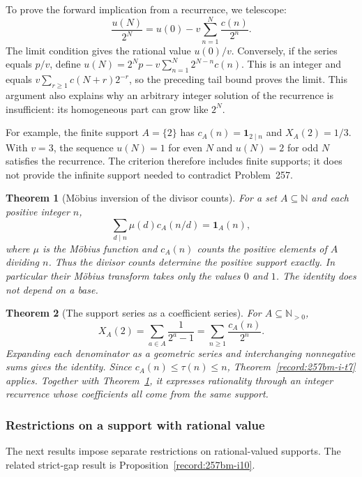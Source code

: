 \documentclass[11pt]{article}
\theoremstyle{plain}
\newtheorem{thm}{Theorem}[section]
\theoremstyle{definition}
\theoremstyle{remark}
\newcommand{\N}{\mathbb{N}}
\newcommand{\Npos}{\mathbb{N}_{>0}}
\begin{document}
To prove the forward implication from a recurrence, we telescope:
\[
 \frac{u(N)}{2^N}=u(0)-v\sum_{n=1}^N\frac{c(n)}{2^n}.
\]
The limit condition gives the rational value $u(0)/v$.  Conversely, if the
series equals $p/v$, define
$u(N)=2^Np-v\sum_{n=1}^N2^{N-n}c(n)$.  This is an integer and equals
$v\sum_{r\ge1}c(N+r)2^{-r}$, so the preceding tail bound proves the limit.
This argument also explains why an arbitrary integer solution of the
recurrence is insufficient: its homogeneous part can grow like $2^N$.

For example, the finite support $A=\{2\}$ has
$c_A(n)=\mathbf1_{2\mid n}$ and $X_A(2)=1/3$.  With $v=3$, the sequence
$u(N)=1$ for even $N$ and $u(N)=2$ for odd $N$ satisfies the recurrence.
The criterion therefore includes finite supports; it does not provide the
infinite support needed to contradict Problem~257.

\begin{thm}[M\"obius inversion of the divisor counts]\label{record:257bm-i-mob}
For a set $A\subseteq\N$ and each positive integer $n$,
\[
 \sum_{d\mid n}\mu(d)c_A(n/d)=\mathbf1_A(n),
\]
where $\mu$ is the M\"obius function and $c_A(n)$ counts the positive
elements of $A$ dividing $n$.  Thus the divisor counts determine the
positive support exactly.  In particular their M\"obius transform takes
only the values $0$ and $1$.  The identity does not depend on a base.
\end{thm}

\begin{thm}[The support series as a coefficient series]\label{record:257bm-i-bridge}
For $A\subseteq\Npos$,
\[
 X_A(2)=\sum_{a\in A}\frac1{2^a-1}
       =\sum_{n\ge1}\frac{c_A(n)}{2^n}.
\]
Expanding each denominator as a geometric series and interchanging
nonnegative sums gives the identity.  Since $c_A(n)\le\tau(n)\le n$,
Theorem~\ref{record:257bm-i-t7} applies.  Together with
Theorem~\ref{record:257bm-i-mob}, it expresses rationality through an
integer recurrence whose coefficients all come from the same support.
\end{thm}

\subsubsection*{Restrictions on a support with rational value}

The next results impose separate restrictions on rational-valued supports.
The related strict-gap result is Proposition~\ref{record:257bm-i10}.
\end{document}
